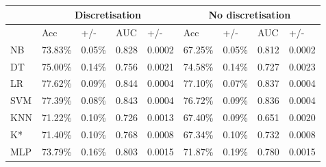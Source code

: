 \begin{table}[htbp]
\caption{}
\begin{tabular}{|l|l|l|r|r|l|l|r|r|}
\hline
 & \multicolumn{ 4}{c|}{Discretisation} & \multicolumn{ 4}{c|}{No discretisation} \\ \hline
 & Acc & +/- & \multicolumn{1}{l|}{AUC} & \multicolumn{1}{l|}{+/-} & Acc & +/- & \multicolumn{1}{l|}{AUC} & \multicolumn{1}{l|}{+/-} \\ \hline
NB & 73.83\% & 0.05\% & 0.828 & 0.0002 & 67.25\% & 0.05\% & 0.812 & 0.0002 \\ \hline
DT & 75.00\% & 0.14\% & 0.756 & 0.0021 & 74.58\% & 0.14\% & 0.727 & 0.0023 \\ \hline
LR & 77.62\% & 0.09\% & 0.844 & 0.0004 & 77.10\% & 0.07\% & 0.837 & 0.0004 \\ \hline
SVM & 77.39\% & 0.08\% & 0.843 & 0.0004 & 76.72\% & 0.09\% & 0.836 & 0.0004 \\ \hline
KNN & 71.22\% & 0.10\% & 0.726 & 0.0013 & 67.40\% & 0.09\% & 0.651 & 0.0020 \\ \hline
K* & 71.40\% & 0.10\% & 0.768 & 0.0008 & 67.34\% & 0.10\% & 0.732 & 0.0008 \\ \hline
MLP & 73.79\% & 0.16\% & 0.803 & 0.0015 & 71.87\% & 0.19\% & 0.780 & 0.0015 \\ \hline
\end{tabular}
\label{}
\end{table}
